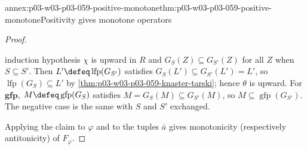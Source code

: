 \begin{annexitem}{annex:p03-w03-p03-059-positive-monotone}{thm:p03-w03-p03-059-positive-monotone}{Positivity gives monotone operators}
\begin{proof}
\begin{itemize}
       induction hypothesis \(\chi\) is upward in \(R\) and \(G_S(Z)
       \subseteq G_{S'}(Z)\) for all \(Z\) when \(S\subseteq S'\). Then
       \(L'\defeq\operatorname{lfp}(G_{S'})\) satisfies
       \(G_S(L')\subseteq G_{S'}(L')=L'\), so
       \(\operatorname{lfp}(G_S)\subseteq L'\) by
       \cref{thm:p03-w03-p03-059-knaster-tarski}; hence \(\theta\) is
       upward. For \(\mathbf{gfp}\), \(M\defeq\operatorname{gfp}(G_S)\)
       satisfies \(M=G_S(M)\subseteq G_{S'}(M)\), so
       \(M\subseteq\operatorname{gfp}(G_{S'})\). The negative case is the
       same with \(S\) and \(S'\) exchanged.
\end{itemize}
Applying the claim to \(\varphi\) and to the tuples \(\bar a\) gives
monotonicity (respectively antitonicity) of \(F_\varphi\).
\end{proof}
\end{annexitem}


